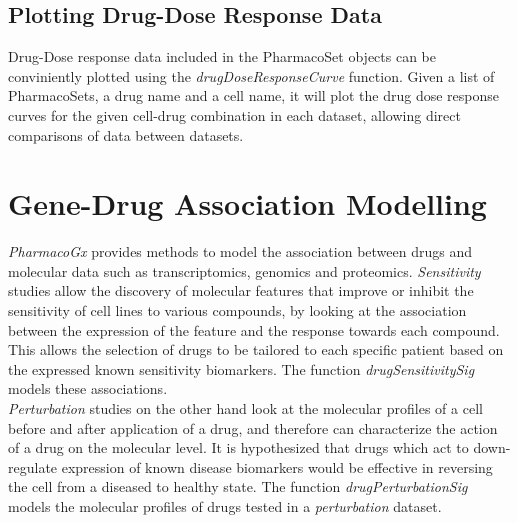 \documentclass[11pt]{article}
\begin{document}
\subsection{Plotting Drug-Dose Response Data}
Drug-Dose response data included in the PharmacoSet objects can be conviniently plotted using the \textit{drugDoseResponseCurve} function. Given a list of PharmacoSets, a drug name and a cell name, it will plot the drug dose response curves for the given cell-drug combination in each dataset, allowing direct comparisons of data between datasets. 

\section{Gene-Drug Association Modelling}
\textit{PharmacoGx} provides methods to model the association between drugs and molecular data such as transcriptomics, genomics and proteomics. 
\textit{Sensitivity} studies allow the discovery of molecular features that improve or inhibit the sensitivity of cell lines to various compounds, by looking at the association between the expression of the feature and the response towards each compound. This allows the selection of drugs to be tailored to each specific patient based on the expressed known sensitivity biomarkers. The function \textit{drugSensitivitySig} models these associations.\\

\textit{Perturbation} studies on the other hand look at the molecular profiles of a cell before and after application of a drug, and therefore can characterize the action of a drug on the molecular level. It is hypothesized that drugs which act to down-regulate expression of known disease biomarkers would be effective in reversing the cell from a diseased to healthy state. The function \textit{drugPerturbationSig} models the molecular profiles of drugs tested in a \textit{perturbation} dataset.

\end{document}
